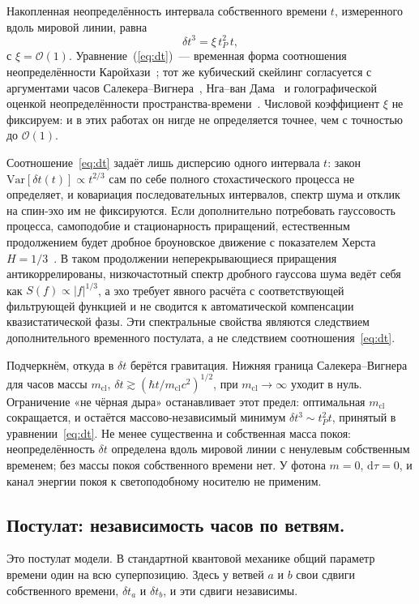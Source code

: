 \documentclass[12pt,a4paper]{article}
\begin{document}
Накопленная неопределённость интервала собственного времени $t$, измеренного вдоль мировой линии, равна
\begin{equation}
\boxed{\delta t^3=\xi\,t_P^2\,t,}
\label{eq:dt}
\end{equation}
с $\xi=\mathcal O(1)$. Уравнение~(\ref{eq:dt})~--- временная форма соотношения неопределённости Каройхази~\cite{karolyhazy1966}; тот же кубический скейлинг согласуется с аргументами часов Салекера--Вигнера~\cite{saleckerwigner}, Нга--ван Дама~\cite{ngvandam1995,ngvandam1994} и голографической оценкой неопределённости пространства-времени~\cite{ng2005foam}. Числовой коэффициент $\xi$ не фиксируем: и в этих работах он нигде не определяется точнее, чем с точностью до $\mathcal O(1)$.

Соотношение~\eqref{eq:dt} задаёт лишь дисперсию одного интервала $t$: закон $\mathrm{Var}[\delta t(t)]\propto t^{2/3}$ сам по себе полного стохастического процесса не определяет, и ковариация последовательных интервалов, спектр шума и отклик на спин-эхо им не фиксируются. Если дополнительно потребовать гауссовость процесса, самоподобие и стационарность приращений, естественным продолжением будет дробное броуновское движение с показателем Херста $H=1/3$~\cite{mandelbrot1968fbm}. В таком продолжении неперекрывающиеся приращения антикоррелированы, низкочастотный спектр дробного гауссова шума ведёт себя как $S(f)\propto|f|^{1/3}$, а эхо требует явного расчёта с соответствующей фильтрующей функцией и не сводится к автоматической компенсации квазистатической фазы. Эти спектральные свойства являются следствием дополнительного временного постулата, а не следствием соотношения~\eqref{eq:dt}.

Подчеркнём, откуда в $\delta t$ берётся гравитация. Нижняя граница Салекера--Вигнера для часов массы $m_{\mathrm{cl}}$, $\delta t\gtrsim(\hbar t/m_{\mathrm{cl}}c^2)^{1/2}$, при $m_{\mathrm{cl}}\to\infty$ уходит в нуль. Ограничение «не чёрная дыра» останавливает этот предел: оптимальная $m_{\mathrm{cl}}$ сокращается, и остаётся массово-независимый минимум $\delta t^3\sim t_P^2 t$, принятый в уравнении~\eqref{eq:dt}. Не менее существенна и собственная масса покоя: неопределённость $\delta t$ определена вдоль мировой линии с ненулевым собственным временем; без массы покоя собственного времени нет. У фотона $m=0$, $\mathrm{d}\tau=0$, и канал энергии покоя к светоподобному носителю не применим.

\subsection{Постулат: независимость часов по ветвям.}
\label{sec:postulate}
Это постулат модели. В стандартной квантовой механике общий параметр времени один на всю суперпозицию. Здесь у ветвей $a$ и $b$ свои сдвиги собственного времени, $\delta t_a$ и $\delta t_b$, и эти сдвиги независимы.
\end{document}
